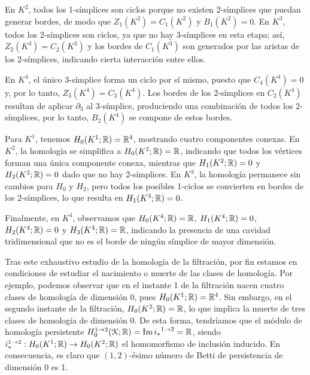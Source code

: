 \begin{ejemplo}
	En $K^{2}$, todos los 1-símplices son ciclos porque no existen 2-símplices que
	puedan generar bordes, de modo que $Z_{1}(K^{2}) = C_{1}(K^{2})$ y $B_{1}(K^{2}
	) = 0$. En $K^{3}$, todos los 2-símplices son ciclos, ya que no hay 3-símplices
	en esta etapa; así, $Z_{2}(K^{3}) = C_{2}(K^{3})$ y los bordes de
	$C_{1}(K^{3})$ son generados por las aristas de los 2-símplices, indicando cierta
	interacción entre ellos.
	
	En $K^{4}$, el único 3-símplice forma un ciclo por sí mismo, puesto que $C_{4}(
	K^{4}) = 0$ y, por lo tanto, $Z_{3}(K^{4}) = C_{3}(K^{4})$. Los bordes de los
	2-símplices en $C_{2}(K^{4})$ resultan de aplicar $\partial_{3}$ al 3-símplice,
	produciendo una combinación de todos los 2-símplices, por lo tanto, $B_{2}(K^{4}
	)$ se compone de estos bordes.
	
	Para $K^{1}$, tenemos $H_{0}(K^{1}; \mathbb{R}) = \mathbb{R}^{4}$, mostrando cuatro componentes
	conexas. En $K^{2}$, la homología se simplifica a $H_{0}(K^{2}; \mathbb{R}) = \mathbb{R}$,
	indicando que todos los vértices forman una única componente conexa, mientras que
	$H_{1}(K^{2}; \mathbb{R}) = 0$ y $H_{2}(K^{2}; \mathbb{R}) = 0$ dado que no hay 2-símplices.
	En $K^{3}$, la homología permanece sin cambios para $H_{0}$ y $H_{2}$, pero
	todos los posibles 1-ciclos se convierten en bordes de los 2-símplices, lo que
	resulta en $H_{1}(K^{3}; \mathbb{R}) = 0$.
	
	Finalmente, en $K^{4}$, observamos que $H_{0}(K^{4}; \mathbb{R}) = \mathbb{R}$,
	$H_{1}(K^{4}; \mathbb{R}) = 0$, $H_{2}(K^{4}; \mathbb{R}) = 0$ y $H_{3}(K^{4}; \mathbb{R}) = \mathbb{R}$,
	indicando la presencia de una cavidad tridimensional que no es el borde de
	ningún símplice de mayor dimensión.
	
	Tras este exhaustivo estudio de la homología de la filtración, por fin estamos
	en condiciones de estudiar el nacimiento o muerte de las clases de homología.
	Por ejemplo, podemos observar que en el instante 1 de la filtración nacen cuatro
	clases de homología de dimensión 0, pues $H_{0}(K^{1};\mathbb{R}) = \mathbb{R}^{4}$. Sin embargo,
	en el segundo instante de la filtración, $H_{0}(K^{2}; \mathbb{R}) = \mathbb{R}$, lo que
	implica la muerte de tres clases de homología de dimensión 0. De esta forma, tendríamos
	que el módulo de homología persistente $H_{0}^{1 \to 2}(\mathcal{K}; \mathbb{R}) = \operatorname{Im}{i_*}
	^{1 \to 2}= \mathbb{R}$, siendo
	$i^{1 \to 2}_{*} : H_{0}(K^{1};\mathbb{R}) \to H_{0}(K^{2};\mathbb{R})$ el homomorfismo de
	inclusión inducido. En consecuencia, es claro que $(1,2)$-ésimo número de
	Betti de persistencia de dimensión 0 es 1.
\end{ejemplo}

